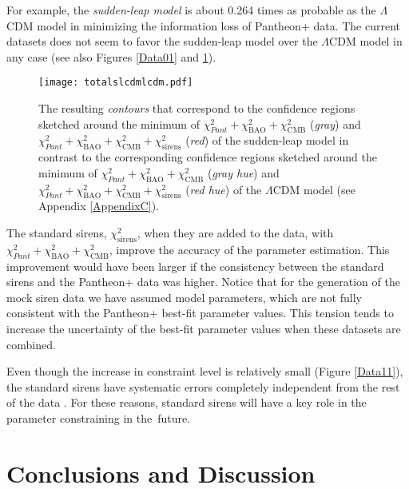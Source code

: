 \documentclass[universe,article,accept,moreauthors,pdftex]{Definitions/mdpi}
\begin{document}
 For example, the \textit{sudden-leap model} is about 0.264 times as probable as the $\Lambda$CDM model in minimizing the information loss of Pantheon+ data. The current datasets does not seem to favor the sudden-leap model over the $\Lambda$CDM model in any case (see also Figures \ref{Data01} and \ref{Data02}).  




\begin{figure}[H] 
    \texttt{[image: totalslcdmlcdm.pdf]}
    \caption{{The resulting} %
 \textit{contours} that correspond to the confidence regions sketched around the minimum of $\chi^{2}_{Pant}+\chi^{2}_{\text{BAO}}+\chi^{2}_{\text{CMB}}$ (\textit{gray}) and $\chi^{2}_{Pant}+\chi^{2}_{\text{BAO}}+\chi^{2}_{\text{CMB}}+\chi^{2}_{\text{sirens}}$ (\textit{red}) of the sudden-leap model in contrast to the corresponding confidence regions sketched around the minimum of $\chi^{2}_{Pant}+\chi^{2}_{\text{BAO}}+\chi^{2}_{\text{CMB}}$ (\textit{gray hue}) and $\chi^{2}_{Pant}+\chi^{2}_{\text{BAO}}+\chi^{2}_{\text{CMB}}+\chi^{2}_{\text{sirens}}$ (\textit{red hue}) of the $\Lambda$CDM model (see Appendix \ref{AppendixC}). }
    \label{Data02}
\end{figure}


The standard sirens, $\chi^{2}_{\text{sirens}}$, when they are added to the data, with $\chi^{2}_{Pant}+\chi^{2}_{\text{BAO}}+\chi^{2}_{\text{CMB}}$, improve the accuracy of the parameter estimation. This improvement would have been larger if the consistency between the standard sirens and the Pantheon+ data was higher. Notice that for the generation of the  mock siren data we have assumed \plcdm model parameters, which are not fully consistent with the Pantheon+ best-fit \lcdm parameter values. This tension tends to increase the uncertainty of the best-fit parameter values when these datasets are combined.

Even though the increase in constraint level is relatively small (Figure \ref{Data11}), the standard sirens have systematic errors completely independent from the rest of the data \cite{Belgacem_2018}. For these reasons, standard sirens will have a key role in the parameter constraining in \mbox{the future}. \\


\section{{Conclusions and Discussion} %
}\label{sec:IV}
\end{document}
